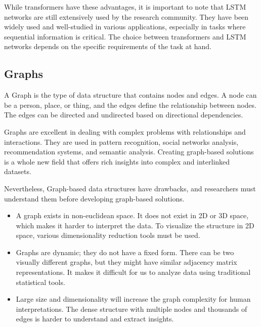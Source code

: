 While transformers have these advantages, it is important to note that LSTM networks are still extensively used by the research community. They have been widely used and well-studied in various applications, especially in tasks where sequential information is critical. The choice between transformers and \ac{LSTM} networks depends on the specific requirements of the task at hand.

\subsection{Graphs}
\label{subsec:3_graphs}


A Graph is the type of data structure that contains nodes and edges. A node can be a person, place, or thing, and the edges define the relationship between nodes. The edges can be directed and undirected based on directional dependencies. 

Graphs are excellent in dealing with complex problems with relationships and interactions. They are used in pattern recognition, social networks analysis, recommendation systems, and semantic analysis. Creating graph-based solutions is a whole new field that offers rich insights into complex and interlinked datasets. 

Nevertheless, Graph-based data structures have drawbacks, and researchers must understand them before developing graph-based solutions.

\begin{itemize}
	
	\item A graph exists in non-euclidean space. It does not exist in 2D or 3D space, which makes it harder to interpret the data. To visualize the structure in 2D space, various dimensionality reduction tools must be used.
	
	\item Graphs are dynamic; they do not have a fixed form. There can be two visually different graphs, but they might have similar adjacency matrix representations. It makes it difficult for us to analyze data using traditional statistical tools.
	
	\item Large size and dimensionality will increase the graph complexity for human interpretations. The dense structure with multiple nodes and thousands of edges is harder to understand and extract insights. 
	
\end{itemize}

